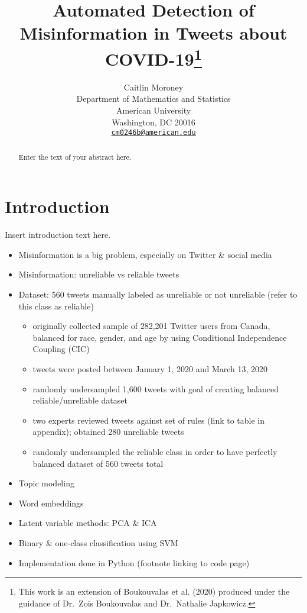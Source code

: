 \documentclass{article}
\title{Automated Detection of Misinformation in Tweets about COVID-19\footnote{This
  work is an extension of Boukouvalas et al. (2020) produced under the
  guidance of Dr.~Zois Boukouvalas and Dr.~Nathalie Japkowicz.}}
\author{
    Caitlin Moroney
   \\
    Department of Mathematics and Statistics \\
    American University \\
  Washington, DC 20016 \\
  \texttt{\href{mailto:cm0246b@american.edu}{\nolinkurl{cm0246b@american.edu}}} \\
  }
\begin{document}
\maketitle

\def\tightlist{}


\begin{abstract}
Enter the text of your abstract here.
\end{abstract}


\newpage

\hypertarget{introduction}{%
\section{Introduction}\label{introduction}}

Insert introduction text here.

\begin{itemize}
\tightlist
\item
  Misinformation is a big problem, especially on Twitter \& social media
\item
  Misinformation: unreliable vs reliable tweets
\item
  Dataset: 560 tweets manually labeled as unreliable or not unreliable
  (refer to this class as reliable)

  \begin{itemize}
  \tightlist
  \item
    originally collected sample of 282,201 Twitter users from Canada,
    balanced for race, gender, and age by using Conditional Independence
    Coupling (CIC)
  \item
    tweets were posted between January 1, 2020 and March 13, 2020
  \item
    randomly undersampled 1,600 tweets with goal of creating balanced
    reliable/unreliable dataset
  \item
    two experts reviewed tweets against set of rules (link to table in
    appendix); obtained 280 unreliable tweets
  \item
    randomly undersampled the reliable class in order to have perfectly
    balanced dataset of 560 tweets total
  \end{itemize}
\item
  Topic modeling
\item
  Word embeddings
\item
  Latent variable methods: PCA \& ICA
\item
  Binary \& one-class classification using SVM
\item
  Implementation done in Python (footnote linking to code page)
\end{itemize}
\end{document}
